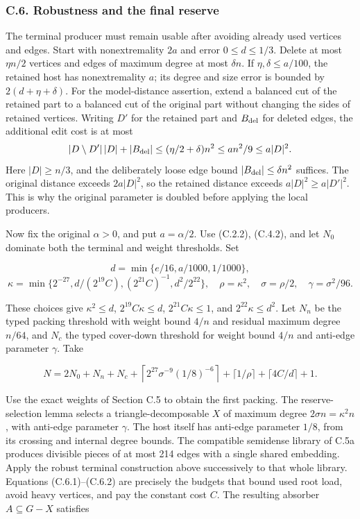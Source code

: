 \documentclass[english,11pt,a4paper]{article}
\newcounter{none}
\begin{document}
\subsubsection{C.6. Robustness and the final reserve}\label{c.6.-robustness-and-the-final-reserve}

The terminal producer must remain usable after avoiding already used vertices and edges. Start with nonextremality \(2a\) and error \(0\le d\le1/3\). Delete at most \(\eta n/2\) vertices and edges of maximum degree at most \(\delta n\). If \(\eta,\delta\le a/100\), the retained host has nonextremality \(a\); its degree and size error is bounded by \(2(d+\eta+\delta)\). For the model-distance assertion, extend a balanced cut of the retained part to a balanced cut of the original part without changing the sides of retained vertices. Writing \(D'\) for the retained part and \(B_{\rm del}\) for deleted edges, the additional edit cost is at most \[|D\setminus D'|\,|D|+|B_{\rm del}|
\le(\eta/2+\delta)n^2\le an^2/9\le a|D|^2.\] Here \(|D|\ge n/3\), and the deliberately loose edge bound \(|B_{\rm del}|\le\delta n^2\) suffices. The original distance exceeds \(2a|D|^2\), so the retained distance exceeds \(a|D|^2\ge a|D'|^2\). This is why the original parameter is doubled before applying the local producers.

Now fix the original \(\alpha>0\), and put \(a=\alpha/2\). Use (C.2.2), (C.4.2), and let \(N_0\) dominate both the terminal and weight thresholds. Set

\[d=\min\{e/16,a/1000,1/1000\},\] \[\kappa=\min\{2^{-27},d/(2^{19}C),(2^{21}C)^{-1},d^2/2^{22}\},
\quad\rho=\kappa^2,\quad\sigma=\rho/2,\quad\gamma=\sigma^2/96.
\tag{C.6.1}\]

These choices give \(\kappa^2\le d\), \(2^{19}C\kappa\le d\), \(2^{21}C\kappa\le1\), and \(2^{22}\kappa\le d^2\). Let \(N_n\) be the typed packing threshold with weight bound \(4/n\) and residual maximum degree \(n/64\), and \(N_c\) the typed cover-down threshold for weight bound \(4/n\) and anti-edge parameter \(\gamma\). Take

\[N=2N_0+N_n+N_c+
\left\lceil2^{27}\sigma^{-9}(1/8)^{-6}\right\rceil
+\lceil1/\rho\rceil+\lceil4C/d\rceil+1.
\tag{C.6.2}\]

Use the exact weights of Section C.5 to obtain the first packing. The reserve-selection lemma selects a triangle-decomposable \(X\) of maximum degree \(2\sigma n=\kappa^2n\), with anti-edge parameter \(\gamma\). The host itself has anti-edge parameter \(1/8\), from its crossing and internal degree bounds. The compatible semidense library of C.5a produces divisible pieces of at most 214 edges with a single shared embedding. Apply the robust terminal construction above successively to that whole library. Equations (C.6.1)--(C.6.2) are precisely the budgets that bound used root load, avoid heavy vertices, and pay the constant cost \(C\). The resulting absorber \(A\subseteq G-X\) satisfies
\end{document}
